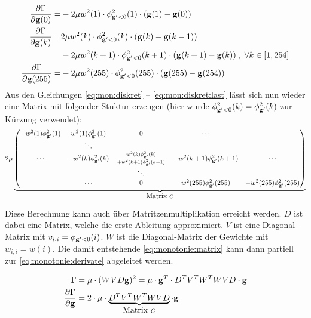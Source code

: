 \begin{align}
\label{eq:mon:diskret}
\frac{\partial \Gamma}{\partial \mathbf g(0)} =& -2\mu w^2(1) \cdot \phi^2_{\mathbf g'<0}(1)\cdot(\mathbf g(1)-\mathbf g(0))\\
\frac{\partial \Gamma}{\partial \mathbf g(k)} 
        =& 2\mu w^2(k) \cdot \phi^2_{\mathbf g'<0}(k)\cdot(\mathbf g(k)-\mathbf g(k-1)) \nonumber \\
         &- 2 \mu w^2(k+1) \cdot \phi^2_{\mathbf g'<0}(k+1)\cdot(\mathbf g(k+1)-\mathbf g(k))
        \; , \; \forall k \in [1,254]\\
        \label{eq:mon:diskret:last}
\frac{\partial \Gamma}{\partial \mathbf g(255)} =& -2\mu w^2(255) \cdot \phi^2_{\mathbf g'<0}(255)\cdot(\mathbf g(255)-\mathbf g(254))
\end{align}
Aus den Gleichungen \ref{eq:mon:diskret} -- \ref{eq:mon:diskret:last} lässt sich nun wieder eine Matrix mit folgender Stuktur erzeugen (hier wurde $\phi^2_{\mathbf g'<0}(k) = \phi^2_{\mathbf g'}(k)$ zur Kürzung verwendet):
\small
\begin{align}
2\mu 
\underbrace{\begin{pmatrix}
-w^2(1)\phi^2_{\mathbf g'}(1) &w^2(1)\phi^2_{\mathbf g'}(1) & 0 & \cdots\\
& \ddots\\
\cdots & -w^2(k)\phi^2_{\mathbf g'}(k) & 
\begin{smallmatrix}
w^2(k)\phi^2_{\mathbf g'}(k) \\+ w^2(k+1)\phi^2_{\mathbf g'}(k+1)
\end{smallmatrix}
 & -w^2(k+1)\phi^2_{\mathbf g'}(k+1) & \cdots \\
& & \ddots\\
& \cdots &  0 & w^2(255)\phi^2_{\mathbf g'}(255) & - w^2(255)\phi^2_{\mathbf g'}(255) \\
\end{pmatrix}}_{\mbox{Matrix } C}
\end{align}
\normalsize

Diese Berechnung kann auch über Matritzenmultiplikation erreicht werden. $D$ ist dabei eine Matrix, welche die erste Ableitung approximiert. $V$ ist eine Diagonal-Matrix mit $v_{i,i} = \phi_{\mathbf g'<0}(i)$. $W$ ist die Diagonal-Matrix der Gewichte mit $w_{i,i} = w(i)$. Die damit entstehende \autoref{eq:monotonie:matrix} kann dann partiell zur \autoref{eq:monotonie:derivate} abgeleitet werden.

\begin{align}
\label{eq:monotonie:matrix}
\Gamma &= \mu  \cdot (W V  D \mathbf g)^2 = \mu \cdot \mathbf g^T \cdot D^T V^T W^T W V D \cdot \mathbf g\\
\label{eq:monotonie:derivate}
\frac{\partial \Gamma}{\partial \mathbf g} &= 2 \cdot \mu \cdot \underbrace{D^T V^T W^T W V D}_{\mbox{Matrix }C}\cdot \mathbf g
\end{align}


